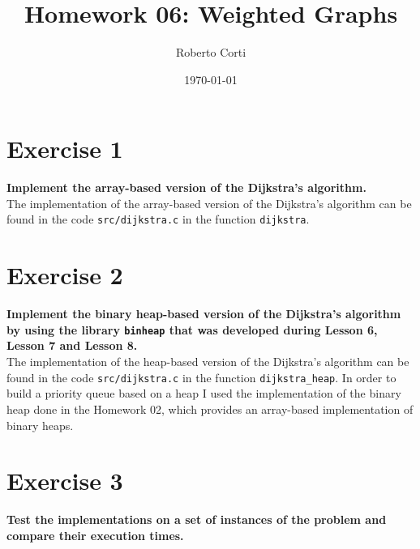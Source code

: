 \documentclass{article}
\title{Homework 06: Weighted Graphs}
\date{\today}
\author{Roberto Corti}
\begin{document}
	
	\maketitle
	
	\section*{Exercise 1}
	\textbf{Implement the array-based version of the Dijkstra’s algorithm.}\\
	
	\noindent The implementation of the array-based version of the Dijkstra’s algorithm can be found in the code \texttt{src/dijkstra.c} in the function \texttt{dijkstra}. 
	
	
	\section*{Exercise 2}
	\textbf{Implement the binary heap-based version of the Dijkstra’s algorithm by using the library \texttt{binheap} that was developed during Lesson 6, Lesson 7 and Lesson 8.}\\
	
	\noindent The implementation of the heap-based version of the Dijkstra’s algorithm can be found in the code \texttt{src/dijkstra.c} in the function \texttt{dijkstra\_heap}. In order to build a priority queue based on a heap I used the implementation of the binary heap done in the Homework 02, which provides an array-based implementation of binary heaps.
	
	\section*{Exercise 3}
	\textbf{Test the implementations on a set of instances of the problem and compare their execution times.}\\ 
	
\end{document}

